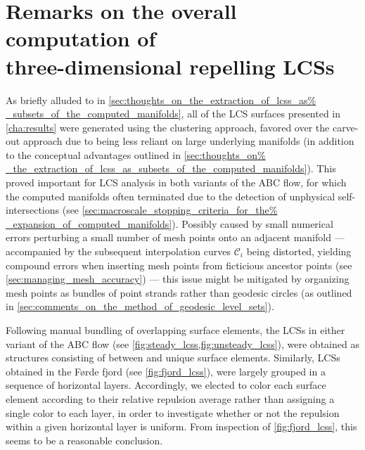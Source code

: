 \section[Remarks on the overall computation of three-dimensional repelling
LCSs]{Remarks on the overall computation of \\\phantom{5.5} three-dimensional
repelling LCSs}
\label{sec:remarks_on_the_overall_computation_of_three_dimensional_repelling_lcss}

As briefly alluded to in \cref{sec:thoughts_on_the_extraction_of_lcss_as%
_subsets_of_the_computed_manifolds}, all of the LCS surfaces presented in
\cref{cha:results} were generated using the clustering approach, favored over
the carve-out approach due to being less reliant on large underlying manifolds
(in addition to the conceptual advantages outlined in \cref{sec:thoughts_on%
_the_extraction_of_lcss_as_subsets_of_the_computed_manifolds}). This proved
important for LCS analysis in both variants of the ABC flow, for which the
computed manifolds often terminated due to the detection of unphysical
self-intersections (see \cref{sec:macroscale_stopping_criteria_for_the%
_expansion_of_computed_manifolds}). Possibly caused by small numerical errors
perturbing a small number of mesh points onto an adjacent manifold ---
accompanied by the subsequent interpolation curves $\mathcal{C}_{i}$ being
distorted, yielding compound errors when inserting mesh points from ficticious
ancestor points (see \cref{sec:managing_mesh_accuracy}) --- this issue might be
mitigated by organizing mesh points as bundles of point strands rather than
geodesic circles (as outlined in
\cref{sec:comments_on_the_method_of_geodesic_level_sets}).

Following manual bundling of overlapping surface elements, the LCSs in either
variant of the ABC flow (see \cref{fig:steady_lcss,fig:unsteady_lcss}), were
obtained as structures consisting of between  and 
unique surface elements. Similarly, LCSs obtained in the Førde fjord (see
\cref{fig:fjord_lcss}), were largely grouped in a sequence of
horizontal layers. Accordingly, we elected to color each surface element
according to their relative repulsion average rather than assigning a single
color to each layer, in order to investigate whether or not the repulsion
within a given horizontal layer is uniform. From inspection of
\cref{fig:fjord_lcss}, this seems to be a reasonable conclusion.

